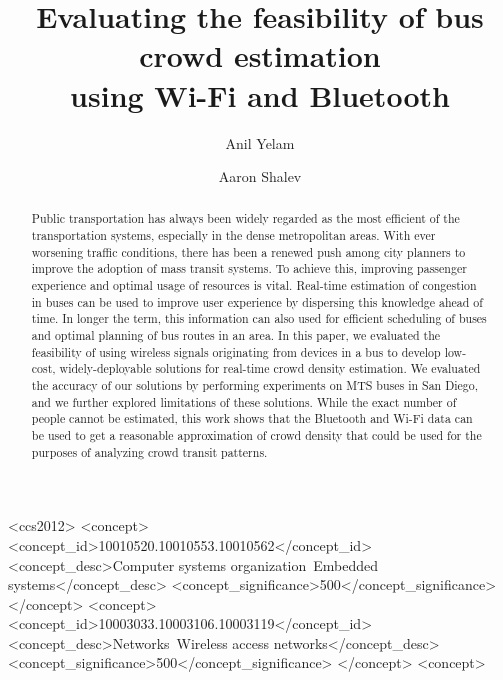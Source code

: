 \documentclass[sigconf]{acmart}
\begin{document}
\title{Evaluating the feasibility of bus crowd estimation\\ using Wi-Fi and Bluetooth}


\author{Anil Yelam}

\author{Aaron Shalev}


\begin{abstract}
Public transportation has always been widely regarded as the most efficient of the transportation systems, especially in the dense metropolitan areas. With ever worsening traffic conditions, there has been a renewed push among city planners to improve the adoption of mass transit systems. To achieve this, improving passenger experience and optimal usage of resources is vital. Real-time estimation of congestion in buses can be used to improve user experience by dispersing this knowledge ahead of time. In longer the term, this information can also used for efficient scheduling of buses and optimal planning of bus routes in an area. In this paper, we evaluated the feasibility of using wireless signals originating from devices in a bus to develop low-cost, widely-deployable solutions for real-time crowd density estimation. We evaluated the accuracy of our solutions by performing experiments on MTS buses in San Diego, and we further explored limitations of these solutions. While the exact number of people cannot be estimated, this work shows that the Bluetooth and Wi-Fi data can be used to get a reasonable approximation of crowd density that could be used for the purposes of analyzing crowd transit patterns.
\end{abstract}

%
%
\begin{CCSXML}
<ccs2012>
 <concept>
  <concept_id>10010520.10010553.10010562</concept_id>
  <concept_desc>Computer systems organization~Embedded systems</concept_desc>
  <concept_significance>500</concept_significance>
 </concept>
 <concept>
  <concept_id>10003033.10003106.10003119</concept_id>
  <concept_desc>Networks~Wireless access networks</concept_desc>
  <concept_significance>500</concept_significance>
  </concept>
 <concept>
\end{CCSXML}




\maketitle





\end{document}
